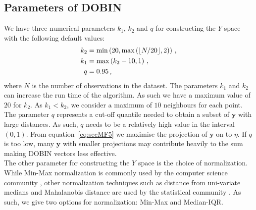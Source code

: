 \documentclass[a4paper,11pt]{article}
\begin{document}
\subsection{Parameters of DOBIN}\label{sec:MathFrame4}
We have three numerical parameters $k_1$, $k_2$ and $q$ for constructing the $Y$ space with the following default values:
\begin{align} \label{eq:secMF15}
   k_2  & = \min\left(20, \max \left( \lfloor N/20 \rfloor ,2 \right )  \right) \notag  \, , \\
   k_1  & = \max \left( k_2-10, 1 \right) \, , \\
   q    & = 0.95 \notag \, , 
\end{align}
where $N$ is the number of observations in the dataset. The parameters $k_1$ and $k_2$ can increase the run time of the algorithm. As such we have a maximum value of $20$ for $k_2$.  As $k_1 < k_2$, we consider a maximum of $10$ neighbours for each point. The parameter $q$ represents a  cut-off quantile needed to obtain a subset of $\bm{y}$ with large distances. As such, $q$ needs to be a relatively high value in the interval $(0,1)$. From equation~\eqref{eq:secMF5} we maximise the projection of $\bm{y}$ on to $\eta$. If $q$ is too low, many $\bm{y}$ with smaller projections may contribute heavily to the sum making DOBIN vectors less effective.  \\

The other parameter for constructing the $Y$ space is the choice of normalization. While Min-Max normalization is commonly used by the computer science community \citep{campos2016evaluation}, other normalization techniques such as distance from uni-variate medians and Mahalanobis distance are used by the statistical community \citep{billor2000bacon}.  As such, we give two options for normalization: Min-Max and Median-IQR.  \\
\end{document}
